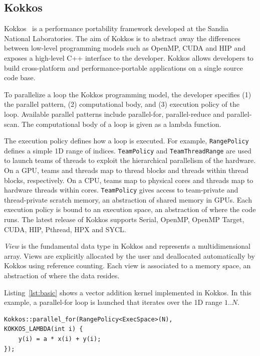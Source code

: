 \documentclass[conference]{IEEEtran}
\begin{document}
\subsection{Kokkos}

Kokkos~\cite{Edwards2014} is a performance portability framework developed at
the Sandia National Laboratories. The aim of Kokkos is to abstract away the
differences between low-level programming models such as OpenMP, CUDA and HIP
and exposes a high-level C++ interface to the developer. Kokkos allows
developers to build cross-platform and performance-portable applications on a
single source code base.

To parallelize a loop the Kokkos programming model, the developer specifies (1)
the parallel pattern, (2) computational body, and (3) execution policy of the
loop. Available parallel patterns include parallel-for, parallel-reduce and
parallel-scan. The computational body of a loop is given as a lambda function.

The execution policy defines how a loop is executed. For example,
\texttt{RangePolicy} defines a simple 1D range of indices. \texttt{TeamPolicy}
and \texttt{TeamThreadRange} are used to launch teams of threads to exploit
the hierarchical parallelism of the hardware. On a GPU, teams and threads map
to thread blocks and threads within thread blocks, respectively. On a CPU,
teams map to physical cores and threads map to hardware threads within cores.
\texttt{TeamPolicy} gives access to team-private and thread-private scratch
memory, an abstraction of shared memory in GPUs. Each execution policy is
bound to an execution space, an abstraction of where the code runs. The latest
release of Kokkos supports Serial, OpenMP, OpenMP Target, CUDA, HIP, Pthread,
HPX and SYCL\@.

\textit{View} is the fundamental data type in Kokkos and represents a
multidimensional array. Views are explicitly allocated by the user and
deallocated automatically by Kokkos using reference counting. Each view is
associated to a memory space, an abstraction of where the data resides.

Listing~\ref{lst:basic} shows a vector addition  kernel implemented in Kokkos.
In this example, a parallel-for loop is launched that iterates over the 1D
range $1..N$.

\begin{lstlisting}[caption={Basic data parallel loop},label={lst:basic}]
Kokkos::parallel_for(RangePolicy<ExecSpace>(N),
KOKKOS_LAMBDA(int i) {
    y(i) = a * x(i) + y(i);
});
\end{lstlisting}
\end{document}

